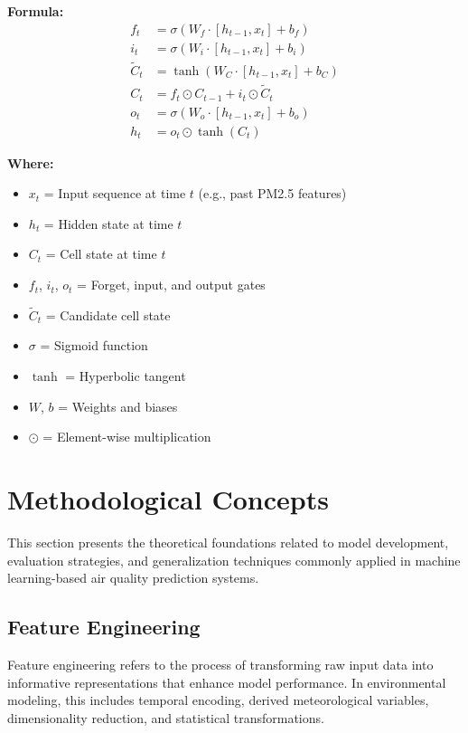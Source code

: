 \documentclass[12pt]{report}
\begin{document}
\noindent\textbf{Formula:}
\[
\begin{aligned}
    f_t &= \sigma(W_f \cdot [h_{t-1}, x_t] + b_f) \\
    i_t &= \sigma(W_i \cdot [h_{t-1}, x_t] + b_i) \\
    \tilde{C}_t &= \tanh(W_C \cdot [h_{t-1}, x_t] + b_C) \\
    C_t &= f_t \odot C_{t-1} + i_t \odot \tilde{C}_t \\
    o_t &= \sigma(W_o \cdot [h_{t-1}, x_t] + b_o) \\
    h_t &= o_t \odot \tanh(C_t)
\end{aligned}
\]

\noindent\textbf{Where:}
\begin{itemize}
    \item $x_t$ = Input sequence at time $t$ (e.g., past PM2.5 features)
    \item $h_t$ = Hidden state at time $t$
    \item $C_t$ = Cell state at time $t$
    \item $f_t$, $i_t$, $o_t$ = Forget, input, and output gates
    \item $\tilde{C}_t$ = Candidate cell state
    \item $\sigma$ = Sigmoid function
    \item $\tanh$ = Hyperbolic tangent
    \item $W$, $b$ = Weights and biases
    \item $\odot$ = Element-wise multiplication
\end{itemize}
\section{Methodological Concepts}

This section presents the theoretical foundations related to model development, evaluation strategies, and generalization techniques commonly applied in machine learning-based air quality prediction systems.

\subsection{Feature Engineering}

Feature engineering refers to the process of transforming raw input data into informative representations that enhance model performance. In environmental modeling, this includes temporal encoding, derived meteorological variables, dimensionality reduction, and statistical transformations.
\end{document}
